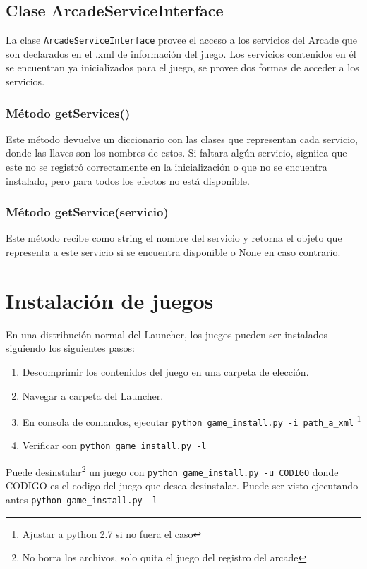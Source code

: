 \documentclass[language=spanish]{article}
\begin{document}
\subsection{Clase ArcadeServiceInterface}

La clase {\tt ArcadeServiceInterface} provee el acceso a los servicios del Arcade que son declarados en el .xml de información del juego. Los servicios contenidos en él se encuentran ya inicializados para el juego, se provee dos formas de acceder a los servicios.

\subsubsection{Método getServices()}

Este método devuelve un diccionario con las clases que representan cada servicio, donde las llaves son los nombres de estos. Si faltara algún servicio, signiica que este no se registró correctamente en la inicialización o que no se encuentra instalado, pero para todos los efectos no está disponible.

\subsubsection{Método getService(servicio)}

Este método recibe como string el nombre del servicio y retorna  el objeto que representa a este servicio si se encuentra disponible o None en caso contrario.

\section{Instalación de juegos}

En una distribución normal del Launcher, los juegos pueden ser instalados siguiendo los siguientes pasos:\\
\begin{enumerate}
	\item Descomprimir los contenidos del juego en una carpeta de elección.
	\item Navegar a carpeta del Launcher.
	\item En consola de comandos, ejecutar {\tt python game\_install.py -i path\_a\_xml} \footnote{Ajustar a python 2.7 si no fuera el caso}
	\item Verificar con {\tt python game\_install.py -l}
\end{enumerate}
Puede desinstalar\footnote{No borra los archivos, solo quita el juego del registro del arcade} un juego con {\tt python game\_install.py -u CODIGO} donde CODIGO es el codigo del juego que desea desinstalar. Puede ser visto ejecutando antes {\tt python game\_install.py -l}
\end{document}
